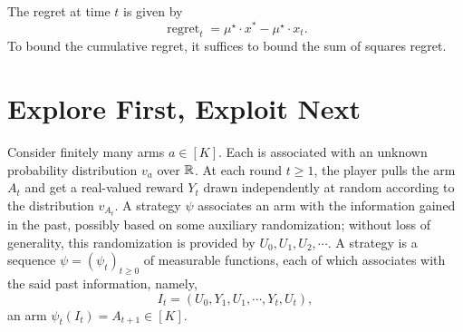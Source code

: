 \documentclass[letterpaper,11pt]{article}
\begin{document}
The regret at time $t$ is given by
$$
\operatorname{regret}_t=\mu^{\star} \cdot x^*-\mu^{\star} \cdot x_t.
$$
To bound the cumulative regret, it suffices to bound the sum of squares regret. 




\section{Explore First, Exploit Next}

Consider finitely many arms $a \in [K]$. Each is associated with an unknown probability distribution $v_a$ over $\mathbb{R}$. At each round $t \geq 1$, the player pulls the arm $A_t$ and get a real-valued reward $Y_t$ drawn independently at random according to the distribution $v_{A_t}$. A strategy $\psi$ associates an arm with the information gained in the past, possibly based on some auxiliary randomization; without loss of generality, this randomization is provided by $U_0, U_1, U_2, \cdots$. A strategy is a sequence $\psi = (\psi_{t})_{t \geq 0}$ of measurable functions, each of  which associates with the said past information, namely,
\begin{equation*}
    I_t = \left(U_0, Y_1, U_1, \cdots, Y_t, U_t\right),
\end{equation*}
an arm $\psi_t(I_t) = A_{t+1} \in [K]$. 

\appendix





\end{document}

